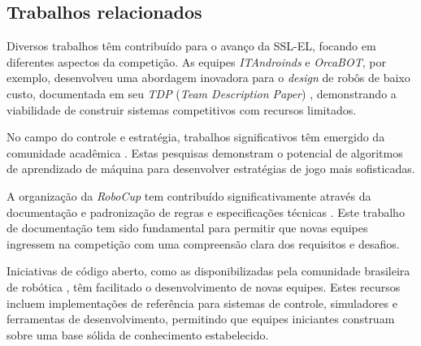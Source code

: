 \subsection{Trabalhos relacionados}
\label{subsec:futebol_trabalhos}

Diversos trabalhos têm contribuído para o avanço da SSL-EL, focando em diferentes aspectos da competição. As equipes \textit{ITAndroinds} e \textit{OrcaBOT}, por exemplo, desenvolveu uma abordagem inovadora para o \textit{design} de robôs de baixo custo, documentada em seu \textit{TDP} (\textit{Team Description Paper}) \cite{orcabot_tdp_2024, itandroids_tdp_2023}, demonstrando a viabilidade de construir sistemas competitivos com recursos limitados.

No campo do controle e estratégia, trabalhos significativos têm emergido da comunidade acadêmica \cite{bruno_brandao, robocin_trabalho}. Estas pesquisas demonstram o potencial de algoritmos de aprendizado de máquina para desenvolver estratégias de jogo mais sofisticadas.

A organização da \textit{RoboCup} tem contribuído significativamente através da documentação e padronização de regras e especificações técnicas \cite{regras_ssl_el_2024}. Este trabalho de documentação tem sido fundamental para permitir que novas equipes ingressem na competição com uma compreensão clara dos requisitos e desafios.

Iniciativas de código aberto, como as disponibilizadas pela comunidade brasileira de robótica \cite{robocup_ssl_brasil}, têm facilitado o desenvolvimento de novas equipes. Estes recursos incluem implementações de referência para sistemas de controle, simuladores e ferramentas de desenvolvimento, permitindo que equipes iniciantes construam sobre uma base sólida de conhecimento estabelecido.